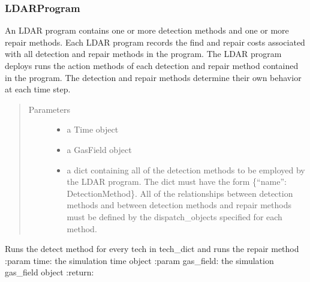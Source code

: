 \documentclass[letterpaper,10pt,english]{sphinxmanual}
\begin{document}
\subsubsection{LDARProgram}
\label{\detokenize{index:ldarprogram}}

\begin{fulllineitems}
\label{\detokenize{index:feast.DetectionModules.ldar_program.LDARProgram}}
An LDAR program contains one or more detection methods and one or more repair methods. Each LDAR program records
the find and repair costs associated with all detection and repair methods in the program. The LDAR program
deploys runs the action methods of each detection and repair method contained in the program. The detection and
repair methods determine their own behavior at each time step.
\begin{quote}\begin{description}
\item[{Parameters}] \leavevmode\begin{itemize}
\item {} 
 \textendash{} a Time object

\item {} 
 \textendash{} a GasField object

\item {} 
 \textendash{} a dict containing all of the detection methods to be employed by the LDAR program. The dict
must have the form \{“name”: DetectionMethod\}. All of the relationships between detection methods and between
detection methods and repair methods must be defined by the dispatch\_objects specified for each method.

\end{itemize}

\end{description}\end{quote}

\begin{fulllineitems}
\label{\detokenize{index:feast.DetectionModules.ldar_program.LDARProgram.action}}
Runs the detect method for every tech in tech\_dict and runs the repair method
:param time: the simulation time object
:param gas\_field: the simulation gas\_field object
:return:

\end{fulllineitems}


\end{fulllineitems}
\end{document}
